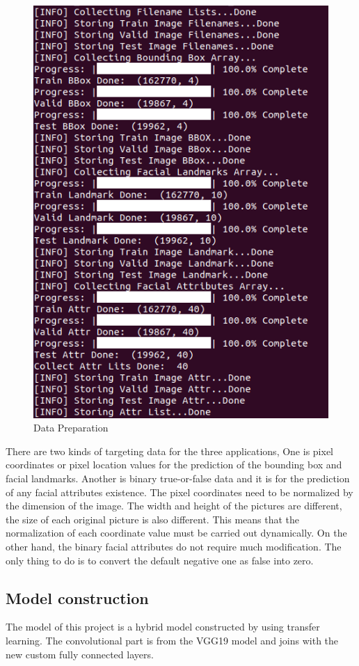 \documentclass{article}
\begin{document}
\begin{figure}
  \centering
  \includegraphics[scale=0.4]{Fig6}
  \caption{Data Preparation}
  \label{Fig6}
\end{figure}

There are two kinds of targeting data for the three applications, One is pixel coordinates or pixel location values for the prediction of the bounding box and facial landmarks. Another is binary true-or-false data and it is for the prediction of any facial attributes existence. The pixel coordinates need to be normalized by the dimension of the image. The width and height of the pictures are different, the size of each original picture is also different. This means that the normalization of each coordinate value must be carried out dynamically. On the other hand, the binary facial attributes do not require much modification. The only thing to do is to convert the default negative one as false into zero.

\subsection{Model construction}
The model of this project is a hybrid model constructed by using transfer learning. The convolutional part is from the VGG19 model and joins with the new custom fully connected layers. 
\end{document}
